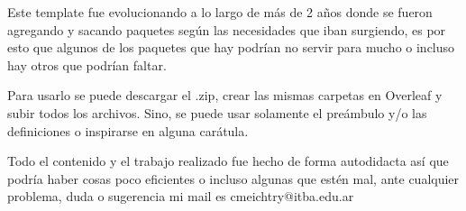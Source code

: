 
Este template fue evolucionando a lo largo de más de 2 años donde se fueron agregando y sacando paquetes según las necesidades que iban surgiendo, es por esto que algunos de los paquetes que hay podrían no servir para mucho o incluso hay otros que podrían faltar.

Para usarlo se puede descargar el .zip, crear las mismas carpetas en Overleaf y subir todos los archivos. Sino, se puede usar solamente el preámbulo y/o las definiciones o inspirarse en alguna carátula.

Todo el contenido y el trabajo realizado fue hecho de forma autodidacta así que podría haber cosas poco eficientes o incluso algunas que estén mal, ante cualquier problema, duda o sugerencia mi mail es cmeichtry@itba.edu.ar